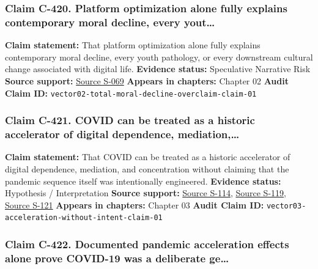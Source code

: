 \documentclass[
  american,
  11pt,
  letterpaper,
]{article}
\begin{document}
\subsubsection{Claim C-420. Platform optimization alone fully explains
contemporary moral decline, every
yout\ldots{}}\label{claim-c-420-platform-optimization-alone-fully-explains-contemporary-moral-decline-every-yout}

\textbf{Claim statement:} That platform optimization alone fully
explains contemporary moral decline, every youth pathology, or every
downstream cultural change associated with digital life.
\textbf{Evidence status:} Speculative Narrative Risk \textbf{Source
support:}
\hyperref[source-s-069-social-media-and-youth-mental-health-the-u-s-surgeon-general-s-advisory]{Source
S-069} \textbf{Appears in chapters:} Chapter 02 \textbf{Audit Claim ID:}
\texttt{vector02-total-moral-decline-overclaim-claim-01}

\subsubsection{Claim C-421. COVID can be treated as a historic
accelerator of digital dependence,
mediation,\ldots{}}\label{claim-c-421-covid-can-be-treated-as-a-historic-accelerator-of-digital-dependence-mediation}

\textbf{Claim statement:} That COVID can be treated as a historic
accelerator of digital dependence, mediation, and concentration without
claiming that the pandemic sequence itself was intentionally engineered.
\textbf{Evidence status:} Hypothesis / Interpretation \textbf{Source
support:}
\hyperref[source-s-114-work-from-home-is-here-to-stay-call-for-flexibility-in-post-pandemic-work-policies]{Source
S-114},
\hyperref[source-s-119-big-tech-announces-striking-pandemic-gains-as-small-businesses-strain-to-find-their-footing]{Source
S-119},
\hyperref[source-s-121-what-social-media-told-about-us-in-the-time-of-covid-19-a-scoping-review]{Source
S-121} \textbf{Appears in chapters:} Chapter 03 \textbf{Audit Claim ID:}
\texttt{vector03-acceleration-without-intent-claim-01}

\subsubsection{Claim C-422. Documented pandemic acceleration effects
alone prove COVID-19 was a deliberate
ge\ldots{}}\label{claim-c-422-documented-pandemic-acceleration-effects-alone-prove-covid-19-was-a-deliberate-ge}
\end{document}
